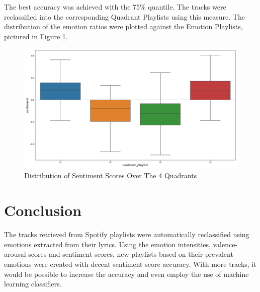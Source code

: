\documentclass[11pt]{article}
\begin{document}
The best accuracy was achieved with the 75\% quantile. The tracks were reclassified into the corresponding Quadrant Playlists using this measure. The distribution of the emotion ratios were plotted against the Emotion Playlists, pictured in Figure \ref{fig:quad_playlist}.

\begin{figure}[!ht]
  \includegraphics[scale=0.42]{../statics/plots/quadrant_playlist.png}
  \centering
  \caption{Distribution of Sentiment Scores Over The 4 Quadrants}
  \label{fig:quad_playlist}
\end{figure}

\section{Conclusion}

The tracks retrieved from Spotify playlists were automatically reclassified using emotions extracted from their lyrics. Using the emotion intensities, valence-arousal scores and sentiment scores, new playlists based on their prevalent emotions were created with decent sentiment score accuracy. With more tracks, it would be possible to increase the accuracy and even employ the use of machine learning classifiers.

{}


\end{document}
